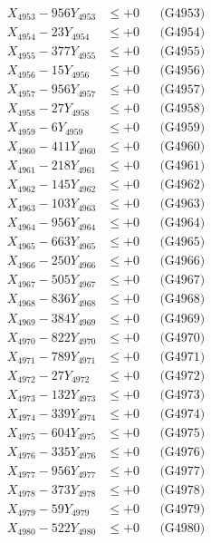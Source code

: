 \documentclass[a4paper,10pt]{article}
\begin{document}
{\begin{align}
X_{4953} - 956Y_{4953} &\leq +0 && \text{(G4953)} \\
X_{4954} - 23Y_{4954} &\leq +0 && \text{(G4954)} \\
X_{4955} - 377Y_{4955} &\leq +0 && \text{(G4955)} \\
X_{4956} - 15Y_{4956} &\leq +0 && \text{(G4956)} \\
X_{4957} - 956Y_{4957} &\leq +0 && \text{(G4957)} \\
X_{4958} - 27Y_{4958} &\leq +0 && \text{(G4958)} \\
X_{4959} - 6Y_{4959} &\leq +0 && \text{(G4959)} \\
X_{4960} - 411Y_{4960} &\leq +0 && \text{(G4960)} \\
\allowbreak
X_{4961} - 218Y_{4961} &\leq +0 && \text{(G4961)} \\
X_{4962} - 145Y_{4962} &\leq +0 && \text{(G4962)} \\
X_{4963} - 103Y_{4963} &\leq +0 && \text{(G4963)} \\
X_{4964} - 956Y_{4964} &\leq +0 && \text{(G4964)} \\
X_{4965} - 663Y_{4965} &\leq +0 && \text{(G4965)} \\
X_{4966} - 250Y_{4966} &\leq +0 && \text{(G4966)} \\
X_{4967} - 505Y_{4967} &\leq +0 && \text{(G4967)} \\
X_{4968} - 836Y_{4968} &\leq +0 && \text{(G4968)} \\
X_{4969} - 384Y_{4969} &\leq +0 && \text{(G4969)} \\
X_{4970} - 822Y_{4970} &\leq +0 && \text{(G4970)} \\
\allowbreak
X_{4971} - 789Y_{4971} &\leq +0 && \text{(G4971)} \\
X_{4972} - 27Y_{4972} &\leq +0 && \text{(G4972)} \\
X_{4973} - 132Y_{4973} &\leq +0 && \text{(G4973)} \\
X_{4974} - 339Y_{4974} &\leq +0 && \text{(G4974)} \\
X_{4975} - 604Y_{4975} &\leq +0 && \text{(G4975)} \\
X_{4976} - 335Y_{4976} &\leq +0 && \text{(G4976)} \\
X_{4977} - 956Y_{4977} &\leq +0 && \text{(G4977)} \\
X_{4978} - 373Y_{4978} &\leq +0 && \text{(G4978)} \\
X_{4979} - 59Y_{4979} &\leq +0 && \text{(G4979)} \\
X_{4980} - 522Y_{4980} &\leq +0 && \text{(G4980)} \\

\end{align}}
\end{document}
